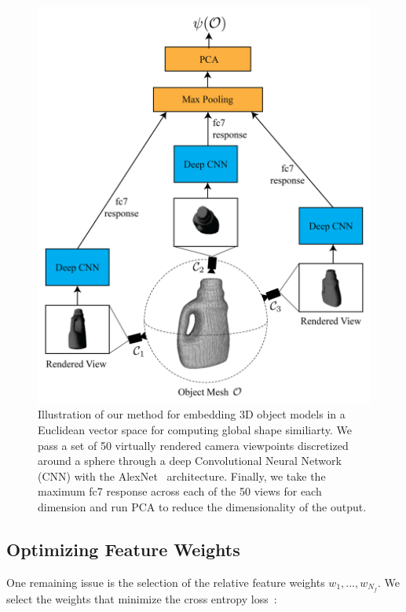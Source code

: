 \begin{figure}[t!]
\centering
\includegraphics[scale=0.3]{figures/illustrations/cnn_model.png}
\caption{Illustration of our method for embedding 3D object models in a Euclidean vector space for computing global shape similiarty. We pass a set of 50 virtually rendered camera viewpoints discretized around a sphere through a deep Convolutional Neural Network (CNN) with the AlexNet~\cite{krizhevsky2012imagenet} architecture. Finally, we take the maximum fc7 response across each of the 50 views for each dimension and run PCA to reduce the dimensionality of the output.}
\vspace*{-15pt}
\end{figure}

\subsection{Optimizing Feature Weights}
One remaining issue is the selection of the relative feature weights $w_1, ..., w_{N_f}$.
We select the weights that minimize the cross entropy loss~\cite{}:

